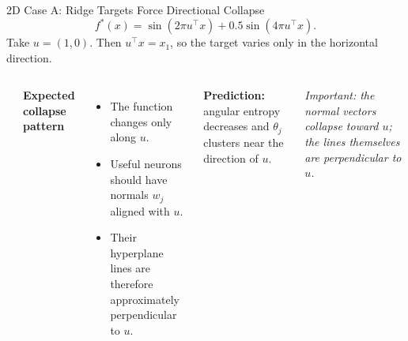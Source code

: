 \documentclass[aspectratio=169,10pt]{beamer}
\begin{document}
\begin{frame}{2D Case A: Ridge Targets Force Directional Collapse}
\small
\[
f^\ast(x)=\sin(2\pi u^\top x)+0.5\sin(4\pi u^\top x).
\]
\vspace{-0.35cm}
Take $u=(1,0)$. Then $u^\top x=x_1$, so the target varies only in the horizontal direction.

\begin{columns}[T,onlytextwidth]
\begin{center}
\end{center}

\textbf{\textcolor{rtgnavy}{Expected collapse pattern}}
\begin{itemize}
  \item The function changes only along $u$.
  \item Useful neurons should have normals $w_j$ aligned with $u$.
  \item Their hyperplane lines are therefore approximately perpendicular to $u$.
\end{itemize}

\vspace{0.08cm}
\begin{tcolorbox}[slideboxA]
\centering\textbf{Prediction:} angular entropy decreases and $\theta_j$ clusters near the direction of $u$.
\end{tcolorbox}

\vspace{0.08cm}
\small\textit{Important: the normal vectors collapse toward $u$; the lines themselves are perpendicular to $u$.}
\end{columns}
\end{frame}
\end{document}
